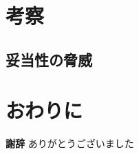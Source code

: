 \documentclass[submit,techrep,noauthor]{ipsj}
\begin{document}
\section{考察}
\label{sec:discussion}
%
\subsection{妥当性の脅威}

\section{おわりに}
\label{sec:conclusion}

\textbf{謝辞} ありがとうございました



\end{document}
